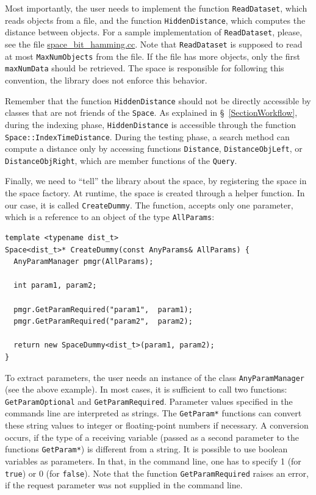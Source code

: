 \documentclass[runningheads,a4paper]{llncs}
\newcommand{\ttt}[1]{\texttt{#1}}
\begin{document}
{Most importantly, the user needs to implement the function \ttt{ReadDataset},
which reads objects from a file, and the function \ttt{HiddenDistance},
which computes the distance between objects.
For a sample implementation of \ttt{ReadDataset},
please, see the file
\href{https://github.com/searchivarius/NonMetricSpaceLib/blob/master/similarity_search/src/space/space_bit_hamming.cc}{space\_bit\_hamming.cc}.
Note that \ttt{ReadDataset} is supposed to read at most \ttt{MaxNumObjects}
from the file. If the file has more objects, only the first \ttt{maxNumData} should be retrieved.
The space is responsible for following this convention, the library does not enforce this behavior.

Remember that the function \ttt{HiddenDistance} should not be directly accessible 
by classes that are not friends of the \ttt{Space}.
As explained in \S~\ref{SectionWorkflow},
during the indexing phase, 
\ttt{HiddenDistance} is accessible through the function
\ttt{Space::IndexTimeDistance}.
During the testing phase, a search method can compute a distance
only by accessing functions \ttt{Distance}, \ttt{DistanceObjLeft}, or
\ttt{DistanceObjRight}, which are member functions of the \ttt{Query}.


Finally, we need to ``tell'' the library about the space,
by registering the space in the space factory.
At runtime, the space is created through a helper function.
In our case, it is called \ttt{CreateDummy}.
The function, accepts only one parameter,
which is a reference to an object of the type \ttt{AllParams}:

\begin{verbatim}
template <typename dist_t>
Space<dist_t>* CreateDummy(const AnyParams& AllParams) {
  AnyParamManager pmgr(AllParams);

  int param1, param2;

  pmgr.GetParamRequired("param1",  param1);
  pmgr.GetParamRequired("param2",  param2);

  return new SpaceDummy<dist_t>(param1, param2);
}
\end{verbatim}
To extract parameters, the user needs an instance of the class \ttt{AnyParamManager} (see the above example).
In most cases, it is sufficient to call two functions: \ttt{GetParamOptional} and
\ttt{GetParamRequired}.
Parameter values specified in the commands line are interpreted as strings.
The \ttt{GetParam*} functions can convert these string values
to integer or floating-point numbers if necessary.
A conversion occurs, if the type of a receiving variable (passed as a second parameter
to the functions \ttt{GetParam*}) is different from a string.
It is possible to use boolean variables as parameters.
In that, in the command line, one has to specify 1 (for \ttt{true}) or 0 (for \ttt{false}).
Note that the function \ttt{GetParamRequired} raises an error, 
if the request parameter was not supplied in the command line.

}
\end{document}
